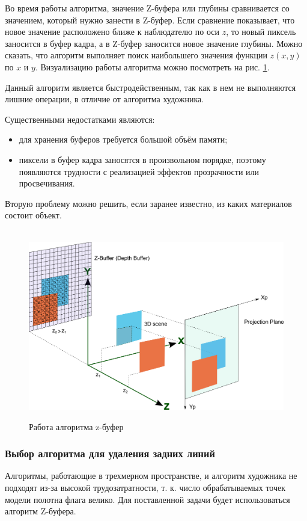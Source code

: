 \vspace{0.3cm}Во время работы алгоритма, значение Z-буфера или глубины сравнивается со значением, который нужно занести в Z-буфер. Если сравнение показывает, что новое значение расположено ближе к наблюдателю по оси $z$, то новый пиксель заносится в буфер кадра, а в Z-буфер заносится новое значение глубины. Можно сказать, что алгоритм выполняет поиск наибольшего значения функции $z(x,y)$ по $x$ и $y$. Визуализацию работы алгоритма можно посмотреть на рис. \ref{fig:zbuffer}.

\vspace{0.3cm}Данный алгоритм является быстродейственным, так как в нем не выполняются лишние операции, в отличие от алгоритма художника.

\vspace{0.3cm}Существенными недостатками являются:
\begin{itemize}
	\item для хранения буферов требуется большой объём памяти\cite{kurov};
	\item пиксели в буфер кадра заносятся в произвольном порядке, поэтому появляются трудности с реализацией эффектов прозрачности или просвечивания.
\end{itemize}

Вторую проблему можно решить, если заранее известно, из каких материалов состоит объект.

\begin{figure}[ht!]\
	\centering
	\includegraphics[scale=0.55]{zbuffer}
	\caption{Работа алгоритма z-буфер}
	\label{fig:zbuffer}
\end{figure}	

\subsubsection{Выбор алгоритма для удаления задних линий}
\hspace{0.6cm}Алгоритмы, работающие в трехмерном пространстве, и алгоритм художника не подходят из-за высокой трудозатратности, т. к. число обрабатываемых точек модели полотна флага велико. Для поставленной задачи будет использоваться алгоритм Z-буфера.

